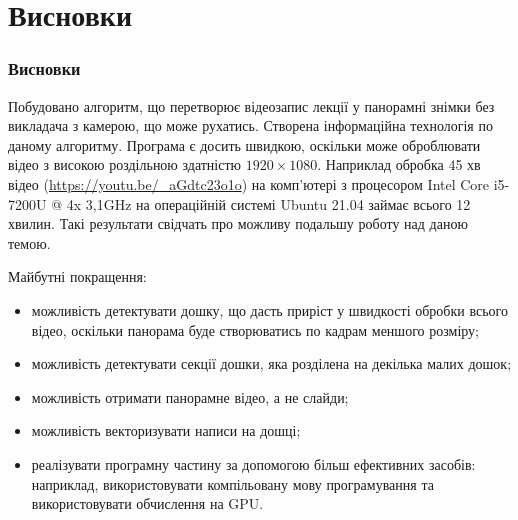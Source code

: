 \section{Висновки}
\begin{frame}
  \frametitle{Висновки}
  Побудовано алгоритм, що перетворює відеозапис лекції у панорамні знімки без викладача з камерою, що може
  рухатись. Створена інформаційна технологія по даному алгоритму. Програма є досить
  швидкою, оскільки може оброблювати відео з високою роздільною здатністю $1920 \times 1080$. 
  Наприклад обробка 45 хв відео (\url{https://youtu.be/_aGdtc23o1o}) на комп'ютері з 
  процесором Intel Core i5-7200U @ 4x 3,1GHz на операційній системі Ubuntu 21.04 займає
  всього 12 хвилин. Такі результати свідчать про можливу подальшу роботу над даною темою.

  Майбутні покращення:
  \begin{itemize}
    \item можливість детектувати дошку, що дасть приріст у швидкості обробки
          всього відео, оскільки панорама буде створюватись по кадрам меншого розміру;
    \item можливість детектувати секції дошки, яка розділена на декілька малих дошок;
    \item можливість отримати панорамне відео, а не слайди;
    \item можливість векторизувати написи на дошці;
    \item реалізувати програмну частину за допомогою більш ефективних засобів:
          наприклад, використовувати компільовану мову програмування
          та використовувати обчислення на GPU.
  \end{itemize}
\end{frame}
